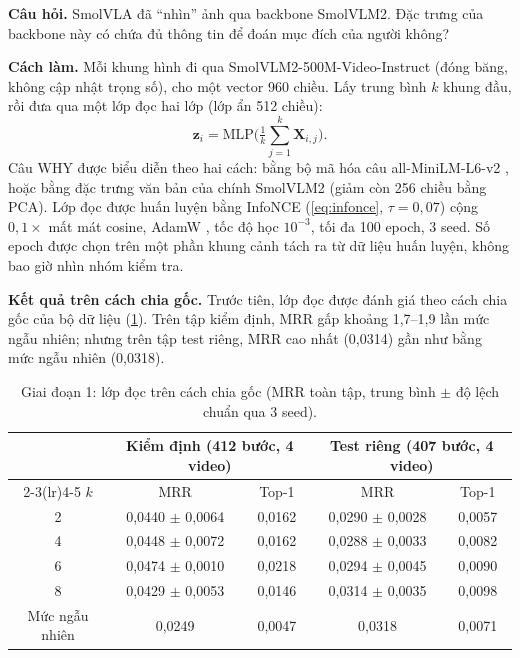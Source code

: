 \documentclass[a4paper,oneside]{report}
\begin{document}
\textbf{Câu hỏi.} SmolVLA đã ``nhìn'' ảnh qua backbone SmolVLM2. Đặc trưng của backbone này có chứa đủ thông tin để đoán mục đích của người không?

\textbf{Cách làm.} Mỗi khung hình đi qua SmolVLM2-500M-Video-Instruct \citep{huggingface2025smolvlm2} (đóng băng, không cập nhật trọng số), cho một vector 960 chiều. Lấy trung bình $k$ khung đầu, rồi đưa qua một lớp đọc hai lớp (lớp ẩn 512 chiều):
\begin{equation}
  \mathbf{z}_i = \mathrm{MLP}\Big(\tfrac{1}{k}\textstyle\sum_{j=1}^{k}\mathbf{X}_{i,j}\Big).
\end{equation}
Câu WHY được biểu diễn theo hai cách: bằng bộ mã hóa câu all-MiniLM-L6-v2 \citep{reimers2019sbert}, hoặc bằng đặc trưng văn bản của chính SmolVLM2 (giảm còn 256 chiều bằng PCA). Lớp đọc được huấn luyện bằng InfoNCE (\cref{eq:infonce}, $\tau=0{,}07$) cộng $0{,}1\times$ mất mát cosine, AdamW \citep{loshchilov2019adamw}, tốc độ học $10^{-3}$, tối đa 100 epoch, 3 seed. Số epoch được chọn trên một phần khung cảnh tách ra từ dữ liệu huấn luyện, không bao giờ nhìn nhóm kiểm tra.

\textbf{Kết quả trên cách chia gốc.} Trước tiên, lớp đọc được đánh giá theo cách chia gốc của bộ dữ liệu (\cref{tab:fixed}). Trên tập kiểm định, MRR gấp khoảng 1,7--1,9 lần mức ngẫu nhiên; nhưng trên tập test riêng, MRR cao nhất (0,0314) gần như bằng mức ngẫu nhiên (0,0318).

\begin{table}[ht]
\centering
\caption{Giai đoạn 1: lớp đọc trên cách chia gốc (MRR toàn tập, trung bình $\pm$ độ lệch chuẩn qua 3 seed).}
\label{tab:fixed}
\begin{tabular}{ccccc}
\toprule
& \multicolumn{2}{c}{Kiểm định (412 bước, 4 video)} & \multicolumn{2}{c}{Test riêng (407 bước, 4 video)} \\
\cmidrule(lr){2-3}\cmidrule(lr){4-5}
$k$ & MRR & Top-1 & MRR & Top-1 \\
\midrule
2 & 0,0440 $\pm$ 0,0064 & 0,0162 & 0,0290 $\pm$ 0,0028 & 0,0057 \\
4 & 0,0448 $\pm$ 0,0072 & 0,0162 & 0,0288 $\pm$ 0,0033 & 0,0082 \\
6 & 0,0474 $\pm$ 0,0010 & 0,0218 & 0,0294 $\pm$ 0,0045 & 0,0090 \\
8 & 0,0429 $\pm$ 0,0053 & 0,0146 & 0,0314 $\pm$ 0,0035 & 0,0098 \\
\midrule
Mức ngẫu nhiên & 0,0249 & 0,0047 & 0,0318 & 0,0071 \\
\bottomrule
\end{tabular}
\end{table}
\end{document}
